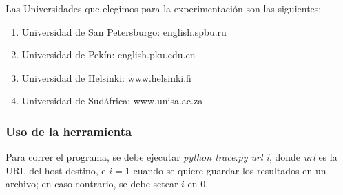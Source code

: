 Las Universidades que elegimos para la experimentación son las siguientes:

\begin{enumerate}
	\item Universidad de San Petersburgo: english.spbu.ru
	\item Universidad de Pekín: english.pku.edu.cn
	\item Universidad de Helsinki: www.helsinki.fi
	\item Universidad de Sudáfrica: www.unisa.ac.za
\end{enumerate}


\subsubsection{Uso de la herramienta}

Para correr el programa, se debe ejecutar \textit{python trace.py url i}, donde \textit{url} es la URL del host destino, e $i = 1$ cuando se quiere guardar los resultados en un archivo; en caso contrario, se debe setear $i$ en $0$.